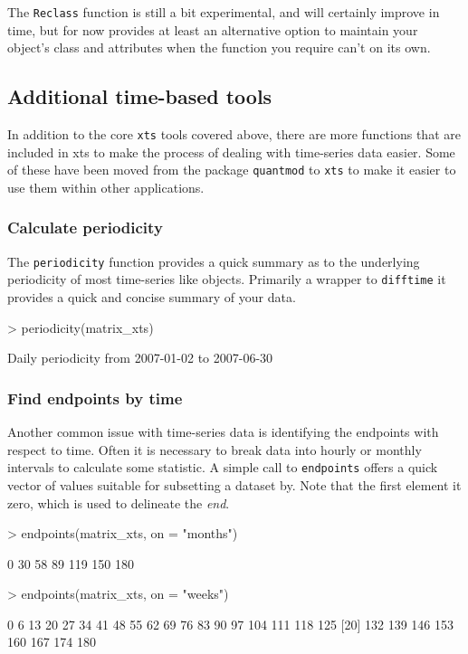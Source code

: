 \documentclass{article}
\begin{document}
The {\tt Reclass} function is still a bit experimental, and will
certainly improve in time, but for now provides at least
an alternative option to maintain your object's class
and attributes when the function you require can't on its own.

\subsection{Additional time-based tools}
In addition to the core {\tt xts} tools covered
above, there are more functions that are included
in xts to make the process of dealing with
time-series data easier. Some of these have been
moved from the package {\tt quantmod} to {\tt xts}
to make it easier to use them within other applications.

\subsubsection*{Calculate periodicity}
The {\tt periodicity} function provides
a quick summary as to the underlying
periodicity of most time-series like
objects. Primarily a wrapper to {\tt difftime}
it provides a quick and concise summary
of your data.
\begin{Schunk}
\begin{Sinput}
> periodicity(matrix_xts)
\end{Sinput}
\begin{Soutput}
Daily periodicity from 2007-01-02 to 2007-06-30 
\end{Soutput}
\end{Schunk}
\subsubsection*{Find endpoints by time}
Another common issue with time-series data
is identifying the endpoints with respect to
time. Often it is necessary to break data
into hourly or monthly intervals to calculate
some statistic. A simple call to {\tt endpoints}
offers a quick vector of values suitable
for subsetting a dataset by. Note that the first
element it zero, which is used to delineate the \emph{end}.
\begin{Schunk}
\begin{Sinput}
> endpoints(matrix_xts, on = "months")
\end{Sinput}
\begin{Soutput}
[1]   0  30  58  89 119 150 180
\end{Soutput}
\begin{Sinput}
> endpoints(matrix_xts, on = "weeks")
\end{Sinput}
\begin{Soutput}
 [1]   0   6  13  20  27  34  41  48  55  62  69  76  83  90  97 104 111 118 125
[20] 132 139 146 153 160 167 174 180
\end{Soutput}
\end{Schunk}
\end{document}
